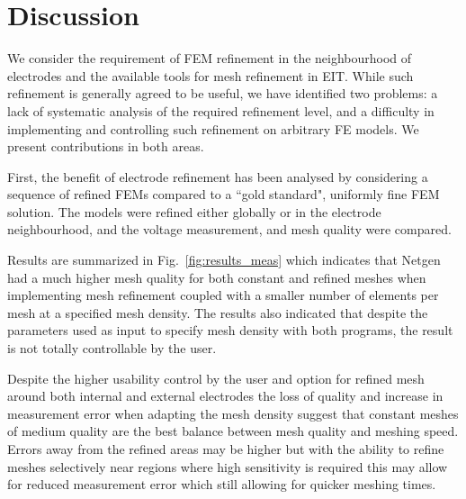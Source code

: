 \documentclass[12pt]{iopart}
\begin{document}
  
  
\section{Discussion}
We consider the requirement of FEM refinement in the neighbourhood of
electrodes and the available tools for mesh refinement in EIT. 
While such refinement is generally agreed to be useful,
we have identified two problems: a lack of systematic analysis of
the required refinement level, and a difficulty in implementing and controlling such
refinement on arbitrary FE models. We present contributions in
both areas.

First, the benefit of electrode refinement has been analysed by considering
a sequence of refined FEMs compared to a ``gold standard", uniformly fine
FEM solution. The models were refined either globally or in the electrode
neighbourhood, and the voltage measurement,  and mesh quality %
were compared.

Results are summarized in Fig.~\ref{fig:results_meas} which indicates
that Netgen had a much higher mesh quality for both constant and refined meshes 
when implementing mesh refinement 
coupled with a smaller number of elements per mesh at a specified 
mesh density. 
The results also indicated that despite the parameters used as input 
to specify mesh density with both programs, the result is not totally
controllable by the user. 

Despite the higher usability control by the user and option for refined mesh around both internal and
external electrodes the loss of quality and increase in measurement error when adapting the mesh density suggest 
that constant meshes of medium quality are the best balance between 
mesh quality and meshing speed. 
Errors away from the refined areas may be higher 
but with the ability to refine meshes selectively near regions where high sensitivity 
is required this may allow for reduced measurement error which still allowing for quicker 
meshing times.
\end{document}
